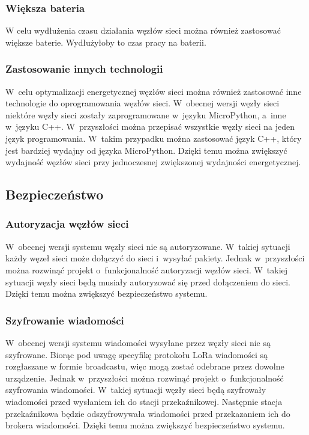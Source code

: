 \subsubsection*{Większa bateria}
W celu wydłużenia czasu działania węzłów sieci można również zastosować większe baterie. Wydłużyłoby to czas pracy na baterii.

\subsubsection*{Zastosowanie innych technologii}
W~celu optymalizacji energetycznej węzłów sieci można również zastosować inne technologie do oprogramowania węzłów sieci.
W~obecnej wersji węzły sieci niektóre węzły sieci zostały zaprogramowane w~języku MicroPython, a~inne w~języku C++.
W~przyszłości można przepisać wszystkie węzły sieci na jeden język programowania.
W~takim przypadku można zastosować język C++, który jest bardziej wydajny od języka MicroPython.
Dzięki temu można zwiększyć wydajność węzłów sieci przy jednoczesnej zwiększonej wydajności energetycznej.

\subsection{Bezpieczeństwo}

\subsubsection{Autoryzacja węzłów sieci}
W~obecnej wersji systemu węzły sieci nie są autoryzowane.
W~takiej sytuacji każdy węzeł sieci może dołączyć do sieci i~wysyłać pakiety.
Jednak w~przyszłości można rozwinąć projekt o~funkcjonalność autoryzacji węzłów sieci.
W~takiej sytuacji węzły sieci będą musiały autoryzować się przed dołączeniem do sieci.
Dzięki temu można zwiększyć bezpieczeństwo systemu.

\subsubsection{Szyfrowanie wiadomości}
W~obecnej wersji systemu wiadomości wysyłane przez węzły sieci nie są szyfrowane.
Biorąc pod uwagę specyfikę protokołu LoRa wiadomości są rozgłaszane w formie broadcastu, więc mogą zostać odebrane przez dowolne urządzenie.
Jednak w~przyszłości można rozwinąć projekt o~funkcjonalność szyfrowania wiadomości.
W~takiej sytuacji węzły sieci będą szyfrowały wiadomości przed wysłaniem ich do stacji przekaźnikowej.
Następnie stacja przekaźnikowa będzie odszyfrowywała wiadomości przed przekazaniem ich do brokera wiadomości.
Dzięki temu można zwiększyć bezpieczeństwo systemu.

